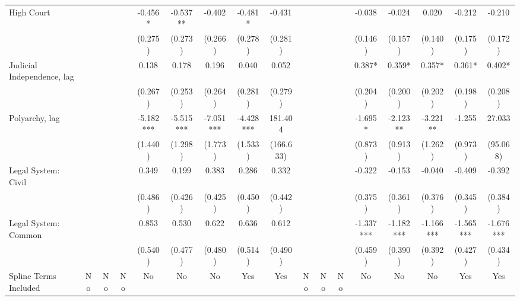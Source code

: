 \begin{table}[htbp]
\begin{tabular}{lcccccccccccccccc}
High Court &  &  &  & -0.456* & -0.537** & -0.402 & -0.481* & -0.431 &  &  &  & -0.038 & -0.024 & 0.020 & -0.212 & -0.210 \\
\vspace{0.1cm}
 &  &  &  & (0.275) & (0.273) & (0.266) & (0.278) & (0.281) &  &  &  & (0.146) & (0.157) & (0.140) & (0.175) & (0.172) \\

Judicial Independence, lag &  &  &  & 0.138 & 0.178 & 0.196 & 0.040 & 0.052 &  &  &  & 0.387* & 0.359* & 0.357* & 0.361* & 0.402* \\
\vspace{0.5cm}
 &  &  &  & (0.267) & (0.253) & (0.264) & (0.281) & (0.279) &  &  &  & (0.204) & (0.200) & (0.202) & (0.198) & (0.208) \\

Polyarchy, lag &  &  &  & -5.182*** & -5.515*** & -7.051*** & -4.428*** & 181.404 &  &  &  & -1.695* & -2.123** & -3.221** & -1.255 & 27.033 \\
\vspace{0.1cm}
 &  &  &  & (1.440) & (1.298) & (1.773) & (1.533) & (166.633) &  &  &  & (0.873) & (0.913) & (1.262) & (0.973) & (95.068) \\

Legal System: Civil &  &  &  & 0.349 & 0.199 & 0.383 & 0.286 & 0.332 &  &  &  & -0.322 & -0.153 & -0.040 & -0.409 & -0.392 \\
\vspace{0.1cm}
 &  &  &  & (0.486) & (0.426) & (0.425) & (0.450) & (0.442) &  &  &  & (0.375) & (0.361) & (0.376) & (0.345) & (0.384) \\

Legal System: Common &  &  &  & 0.853 & 0.530 & 0.622 & 0.636 & 0.612 &  &  &  & -1.337*** & -1.182*** & -1.166*** & -1.565*** & -1.676*** \\
\vspace{0.5cm}
 &  &  &  & (0.540) & (0.477) & (0.480) & (0.514) & (0.490) &  &  &  & (0.459) & (0.390) & (0.392) & (0.427) & (0.434) \\

Spline Terms Included & No & No & No & No & No & No & Yes & Yes & No & No & No & No & No & No & Yes & Yes \\


\end{tabular}
\end{table}
